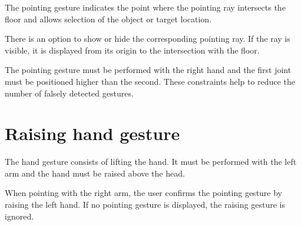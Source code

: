 The pointing gesture indicates the point where the pointing ray intersects the floor and allows selection of the object or target location.\par
There is an option to show or hide the corresponding pointing ray. If the ray is visible, it is displayed from its origin to the intersection with the floor.\par
The pointing gesture must be performed with the right hand and the first joint must be positioned higher than the second. These constraints help to reduce the number of falsely detected gestures.\par

\section{Raising hand gesture}
The hand gesture consists of lifting the hand. It must be performed with the left arm and the hand must be raised above the head.\par
When pointing with the right arm, the user confirms the pointing gesture by raising the left hand. If no pointing gesture is displayed, the raising gesture is ignored.\par


